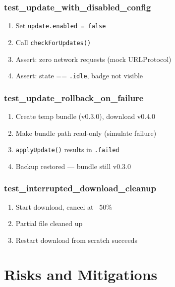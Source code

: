 \documentclass[11pt, a4paper]{article}
\begin{document}
\subsubsection{test\_update\_with\_disabled\_config}

\begin{enumerate}[nosep, leftmargin=*]
  \item Set \texttt{update.enabled = false}
  \item Call \texttt{checkForUpdates()}
  \item Assert: zero network requests (mock URLProtocol)
  \item Assert: state == \texttt{.idle}, badge not visible
\end{enumerate}

\subsubsection{test\_update\_rollback\_on\_failure}

\begin{enumerate}[nosep, leftmargin=*]
  \item Create temp bundle (v0.3.0), download v0.4.0
  \item Make bundle path read-only (simulate failure)
  \item \texttt{applyUpdate()} results in \texttt{.failed}
  \item Backup restored --- bundle still v0.3.0
\end{enumerate}

\subsubsection{test\_interrupted\_download\_cleanup}

\begin{enumerate}[nosep, leftmargin=*]
  \item Start download, cancel at ~50\%
  \item Partial file cleaned up
  \item Restart download from scratch succeeds
\end{enumerate}


\section{Risks and Mitigations}
\label{sec:risks}
\end{document}
